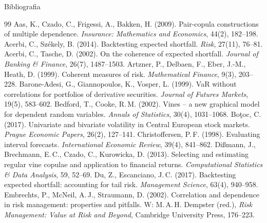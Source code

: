 \documentclass[aspectratio=169,11pt]{beamer}
\begin{document}
\begin{frame}[allowframebreaks]{Bibliografia}
  \scriptsize
  \begin{thebibliography}{99}
    \setlength{\itemsep}{1pt}
      Aas, K., Czado, C., Frigessi, A., Bakken, H. (2009).
      Pair-copula constructions of multiple dependence.
      \emph{Insurance: Mathematics and Economics}, 44(2), 182--198.
      Acerbi, C., Székely, B. (2014). Backtesting expected shortfall.
      \emph{Risk}, 27(11), 76--81.
      Acerbi, C., Tasche, D. (2002). On the coherence of expected shortfall.
      \emph{Journal of Banking \& Finance}, 26(7), 1487--1503.
      Artzner, P., Delbaen, F., Eber, J.-M., Heath, D. (1999).
      Coherent measures of risk. \emph{Mathematical Finance}, 9(3), 203--228.
      Barone-Adesi, G., Giannopoulos, K., Vosper, L. (1999).
      VaR without correlations for portfolios of derivative securities.
      \emph{Journal of Futures Markets}, 19(5), 583--602.
      Bedford, T., Cooke, R.\,M. (2002). Vines -- a new graphical model for
      dependent random variables. \emph{Annals of Statistics}, 30(4), 1031--1068.
      Bo\c{t}oc, C. (2017). Univariate and bivariate volatility in Central
      European stock markets. \emph{Prague Economic Papers}, 26(2), 127--141.
      Christoffersen, P.\,F. (1998). Evaluating interval forecasts.
      \emph{International Economic Review}, 39(4), 841--862.
      Dißmann, J., Brechmann, E.\,C., Czado, C., Kurowicka, D. (2013).
      Selecting and estimating regular vine copulae and application to
      financial returns. \emph{Computational Statistics \& Data Analysis},
      59, 52--69.
      Du, Z., Escanciano, J.\,C. (2017). Backtesting expected shortfall:
      accounting for tail risk. \emph{Management Science}, 63(4), 940--958.
      Embrechts, P., McNeil, A.\,J., Straumann, D. (2002). Correlation and
      dependence in risk management: properties and pitfalls. W:
      M.\,A.\,H. Dempster (red.), \emph{Risk Management: Value at Risk and
      Beyond}, Cambridge University Press, 176--223.

\end{thebibliography}
\end{frame}
\end{document}
